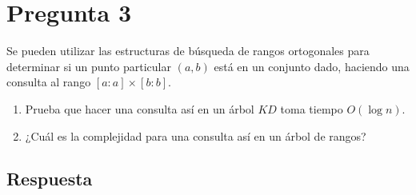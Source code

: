 \section*{Pregunta 3}
\noindent Se pueden utilizar las estructuras de búsqueda de rangos ortogonales para determinar si un punto particular $(a,b)$ está en un conjunto dado, haciendo una consulta al rango $[a:a] \times [b:b]$.
\begin{enumerate}
   \item Prueba que hacer una consulta así en un árbol $KD$ toma tiempo $O(\log n)$.
   \item ¿Cuál es la complejidad para una consulta así en un árbol de rangos?
\end{enumerate}

\subsection*{Respuesta}
